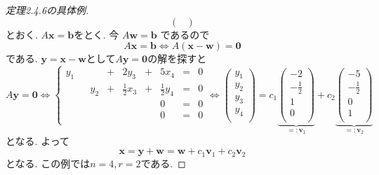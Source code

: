 \documentclass[dvipdfmx,a4paper,11pt]{article} %
\theoremstyle{definition}
\begin{document}
\begin{proof}[定理2.4.6の具体例]
$$\begin{pmatrix}
 \end{pmatrix}
$$
とおく. $A\mathbf{x}=\mathbf{b}$をとく. 
今 
$A\mathbf{w}
=\mathbf{b}$
であるので
$$
A\mathbf{x}=\mathbf{b}
\Leftrightarrow
A(\mathbf{x}- \mathbf{w})=\mathbf{0}
$$
である. $\mathbf{y}=\mathbf{x}- \mathbf{w}$として$A\mathbf{y}=\mathbf{0}$の解を探すと
$$
A\mathbf{y}=\mathbf{0}
\Leftrightarrow
\left\{ 
\begin{matrix}
y_1&  &  &  +& 2y_3& + &5x_4&= & 0\\
 & &y_2& +&\frac{1}{2}x_3&+&\frac{1}{2}y_4&= & 0\\
	& & & &&&0&=&0 \\
	& & & &&&0&=&0 \\
\end{matrix}
\right.
\Leftrightarrow
 \begin{pmatrix}
y_1 \\
y_2 \\
y_3 \\
y_4 \\
 \end{pmatrix}
 =
 c_1 
\underbrace{
  \begin{pmatrix}
-2 \\
-\frac{1}{2} \\
1\\
0 \\
 \end{pmatrix}
 }_{=:\mathbf{v}_1}
 +
 c_2
 \underbrace{
  \begin{pmatrix}
-5 \\
-\frac{1}{2}\\
0 \\
1 \\
 \end{pmatrix}
  }_{=:\mathbf{v}_2}
$$
となる. 
よって
$$
\mathbf{x}
=\mathbf{y}+ \mathbf{w}
=\mathbf{w} + c_1 \mathbf{v}_1 + c_2\mathbf{v}_2
$$
となる. この例では$n=4, r=2$である. 
\end{proof}
\end{document}
